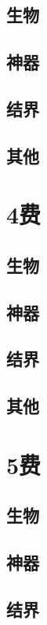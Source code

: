 \documentclass[lang = cn, color = black, 10pt]{AllThatStax}
\begin{document}
\section{生物}

\section{神器}

\section{结界}

\section{其他}

\chapter{4费}

\section{生物}

\section{神器}

\section{结界}

\section{其他}

\chapter{5费}

\section{生物}

\section{神器}

\section{结界}
\end{document}
